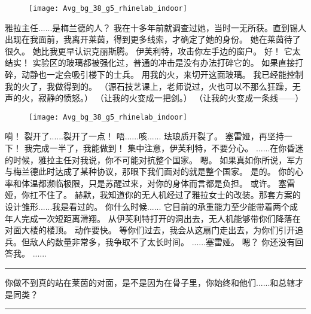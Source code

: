 \documentclass[openany]{book}
\begin{document}
\begin{figure}[h]
    \centering
    \texttt{[image: Avg\_bg\_38\_g5\_rhinelab\_indoor]}
\end{figure}
\begin{dialogue}
     雅拉主任......是梅兰德的人？
     我在十多年前就调查过她，当时一无所获。直到锡人出现在我面前，我离开莱茵，得到更多线索，才确定了她的身份。
     她在莱茵待了很久。
     她比我更早认识克丽斯腾。
     伊芙利特，攻击你左手边的窗户。
     好！
     它太结实！
     实验区的玻璃都被强化过，普通的冲击是没有办法打碎它的。
     如果直接打碎，动静也一定会吸引楼下的士兵。
     用我的火，来切开这面玻璃。
     我已经能控制我的火了，我做得到的。
     （源石技艺课上，老师说过，火也可以不那么狂躁，无声的火，寂静的愤怒。）
     （让我的火变成一把剑。）
     （让我的火变成一条线——）
    \begin{figure}[h]
        \centering
        \texttt{[image: Avg\_bg\_38\_g5\_rhinelab\_indoor]}
    \end{figure}
     嗬！
     裂开了......裂开了一点！
     唔......咳......
     珐琅质开裂了。
     塞雷娅，再坚持一下！
     我完成一半了，我能做到！
     集中注意，伊芙利特，不要分心。
     ......在你昏迷的时候，雅拉主任对我说，你不可能对抗整个国家。
     嗯。
     如果真如你所说，军方与梅兰德此时达成了某种协议，那眼下我们面对的就是整个国家。
     是的。
     你的心率和体温都濒临极限，只是苏醒过来，对你的身体而言都是负担。
     或许。
     塞雷娅，你扛不住了。
     赫默，我知道你的无人机经过了雅拉女士的改装。那套方案的设计雏形......我是看过的。
     你什么时候......
     它目前的承重能力至少能带着两个成年人完成一次短距离滑翔。
     从伊芙利特打开的洞出去，无人机能够带你们降落在对面大楼的楼顶。
     动作要快。
     等你们过去，我会从这扇门走出去，为你们引开追兵。但敌人的数量非常多，我争取不了太长时间。
     ......塞雷娅。
     嗯？
     你还没有回答我。
     ......
\end{dialogue}

\par\noindent\rule{\textwidth}{0.4pt}
你做不到真的站在莱茵的对面，是不是因为在骨子里，你始终和他们......和总辖才是同类？
\par\noindent\rule{\textwidth}{0.4pt}
\end{document}
